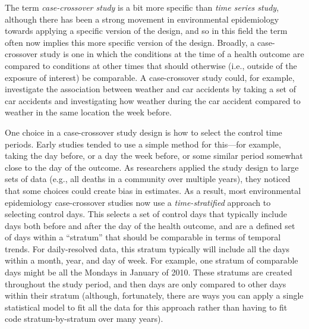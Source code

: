 \documentclass[
]{book}
\begin{document}
The term \emph{case-crossover study} is a bit more specific than \emph{time series study},
although there has been a strong movement in environmental epidemiology towards
applying a specific version of the design, and so in this field the term often
now implies this more specific version of the design. Broadly, a case-crossover
study is one in which the conditions at the time of a health outcome are compared
to conditions at other times that should otherwise (i.e., outside of the exposure
of interest) be comparable. A case-crossover study could, for example, investigate
the association between weather and car accidents by taking a set of car accidents
and investigating how weather during the car accident compared to weather in the
same location the week before.

One choice in a case-crossover study design is how to select the control time
periods. Early studies tended to use a simple method for this---for example, taking
the day before, or a day the week before, or some similar period somewhat
close to the day of the outcome. As researchers applied the study design to large
sets of data (e.g., all deaths in a community over multiple years), they noticed
that some choices could create bias in estimates. As a result, most environmental
epidemiology case-crossover studies now use a \emph{time-stratified} approach to selecting
control days. This selects a set of control days that typically include days both
before and after the day of the health outcome, and are a defined set of days
within a ``stratum'' that should be comparable in terms of temporal trends. For
daily-resolved data, this stratum typically will include all the days within
a month, year, and day of week. For example, one stratum of comparable days might
be all the Mondays in January of 2010. These stratums are created throughout the
study period, and then days are only compared to other days within their stratum
(although, fortunately, there are ways you can apply a single statistical model
to fit all the data for this approach rather than having to fit code
stratum-by-stratum over many years).
\end{document}
